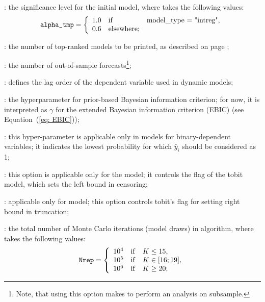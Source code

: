 : the significance
level for the initial model, where 
takes the following values:
\begin{equation}
	\texttt{\lstinline!alpha\_tmp!} = \left\{
	\begin{array}{cll}
		1.0 & \mathrm{if} & \textrm{\lstinline!model_type = "intreg"!},\\
		0.6 & \mathrm{elsewhere}; &\\
	\end{array}
	\right.
	\label{eq:alpha_tmp_setup}
\end{equation}

:
the number of top-ranked models to be printed, as
described on page \pageref{top_ranked_models};

: the number of
out-of-sample forecasts\footnote{Note, that using this
	option makes  to perform an analysis
	on subsample.};

: defines the
lag order of the dependent variable used in dynamic models;

:
the hyperparameter for prior-based Bayesian information
criterion; for now, it is interpreted as $\gamma$ for
the extended Bayesian information criterion (EBIC)
(see Equation~(\ref{eq: EBIC}));

:
this hyper-parameter is applicable only in models for
binary-dependent variables; it indicates the lowest
probability for which $\hat{y}_i$ should be considered as 1;

: this option is
applicable only for the  model; it
controls the  flag of the tobit
model, which sets the left bound in censoring;

: applicable only
for  model; this option controls tobit's
 flag for setting right bound in truncation;

: the total number
of Monte Carlo iterations (model draws) in \MCcube algorithm, where
 takes the following values:
\begin{equation}
	\texttt{\lstinline!Nrep!} = \left\{
	\begin{array}{ccl}
		10^4 & \mathrm{if} & K \leq 15,\\
		10^5 & \mathrm{if} & K \in [16;19],\\
		10^6 & \mathrm{if} & K \geq 20;\\
	\end{array}
	\right.
	\label{eq:Nrep_setup}
\end{equation}

